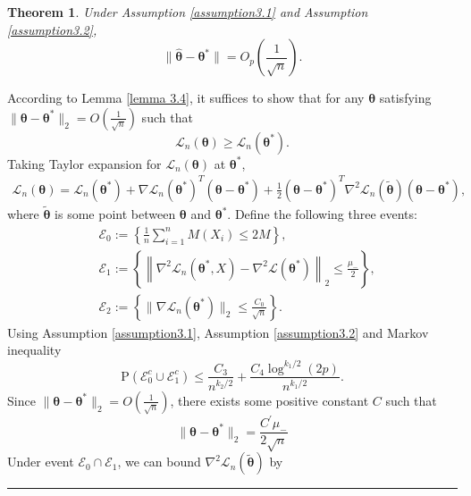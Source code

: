 \documentclass[12pt]{article}
\numberwithin{equation}{section}
\newtheorem{theorem}{Theorem}[section]
\newenvironment{proof}{{\bf Proof:}}{\hfill\rule{2mm}{2mm}}
\begin{document}
\begin{theorem}
	Under Assumption \ref{assumption3.1} and Assumption \ref{assumption3.2}, 
	\begin{equation}
	\|\widehat{\boldsymbol{\theta}}-\boldsymbol{\theta}^{*}\|=O_p\left(\frac{1}{\sqrt{n}}\right).
	\end{equation}
\end{theorem}
\begin{proof}
	According to Lemma \ref{lemma 3.4}, it suffices to show that for any $\boldsymbol{\theta}$ satisfying $\|\boldsymbol{\theta}-\boldsymbol{\theta}^{*}\|_2=O\left(\frac{1}{\sqrt{n}}\right)$ such that
	$$
	\mathcal{L}_n\left(\boldsymbol{\theta}\right)\geq	\mathcal{L}_n\left(\boldsymbol{\theta}^{*}\right).
	$$
	Taking Taylor expansion for $\mathcal{L}_n\left(\boldsymbol{\theta}\right)$ at $\boldsymbol{\theta}^{*}$,
	\begin{align}\label{3.9}
	\mathcal{L}_n\left(\boldsymbol{\theta}\right)=\mathcal{L}_n\left(\boldsymbol{\theta}^{*}\right)+\nabla\mathcal{L}_n\left(\boldsymbol{\theta}^{*}\right)^T\left(\boldsymbol{\theta}-\boldsymbol{\theta}^{*}\right)+\frac{1}{2}\left(\boldsymbol{\theta}-\boldsymbol{\theta}^{*}\right)^T\nabla^2\mathcal{L}_n(\tilde{\boldsymbol{\theta}})\left(\boldsymbol{\theta}-\boldsymbol{\theta}^{*}\right),
	\end{align}
	where $\tilde{\boldsymbol{\theta}}$ is some point between $\boldsymbol{\theta}$ and $\boldsymbol{\theta}^{*}$. 
	Define the following three events:
	\begin{align*}
	&\mathcal{E}_{0}:=\left\{\frac{1}{n} \sum_{i=1}^{n} M\left(X_{i}\right) \leq 2 M\right\},\\
	&\mathcal{E}_{1}:=\left\{\left\|\nabla^{2} \mathcal{L}_n\left(\boldsymbol{\theta}^{*},X\right)-\nabla^{2} \mathcal{L}\left(\boldsymbol{\theta}^{*}\right)\right\|_{2} \leq \frac{\mu_{-}}{2}\right\},\\
	&\mathcal{E}_2:=\left\{\|\nabla\mathcal{L}_n\left(\boldsymbol{\theta}^{*}\right)\|_2\leq \frac{C_0}{\sqrt{n}}\right\}.
	\end{align*}
	Using Assumption \ref{assumption3.1}, Assumption \ref{assumption3.2} and Markov inequality
	$$
	\mathrm{P}\left(\mathcal{E}_{0}^c\cup\mathcal{E}_{1}^c\right)\leq \frac{C_3}{n^{k_2/2}}+\frac{C_4\log ^{k_{1} / 2}(2 p)}{n^{k_1/2}}.
	$$
	Since $\|\boldsymbol{\theta}-\boldsymbol{\theta}^{*}\|_2=O\left(\frac{1}{\sqrt{n}}\right)$, there exists some positive constant $C$ such that 
	$$
	\|\boldsymbol{\theta}-\boldsymbol{\theta}^{*}\|_2=\frac{C^{'}\mu_{-}}{2\sqrt{n}}
	$$
	Under event $\mathcal{E}_0\cap \mathcal{E}_1$, we can bound $\nabla^2\mathcal{L}_n(\tilde{\boldsymbol{\theta}})$ by

\end{proof}
\end{document}
